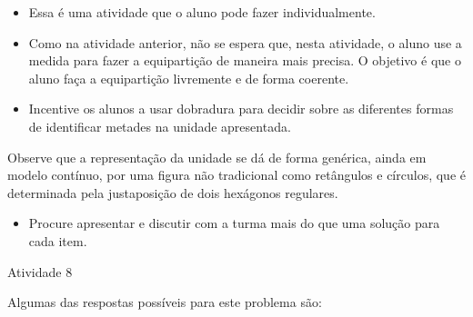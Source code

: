 \begin{multicols}{2}
   \vspace{.1cm}

\begin{itemize} %
    \item       Essa é uma atividade que o aluno pode fazer individualmente.
    \item       Como na atividade anterior, não se espera que, nesta atividade, o aluno use a medida para fazer a equipartição de maneira mais precisa. O objetivo é que o aluno faça a equipartição livremente e de forma coerente.
    \item       Incentive os alunos a usar dobradura para decidir sobre as diferentes formas de identificar metades na unidade apresentada.
\end{itemize} %

Observe que a representação da unidade se dá de forma genérica, ainda em modelo contínuo, por uma figura não tradicional como retângulos e círculos, que é determinada pela justaposição de dois hexágonos regulares.

\begin{itemize} %
    \item       Procure apresentar e discutir com a turma mais do que uma solução para cada item.
\end{itemize} %

\begin{resposta*}{Atividade 8}

Algumas das respostas possíveis para este problema são:
\begin{center}
\hspace{.2cm}


\end{center}
\end{resposta*}
\end{multicols}
